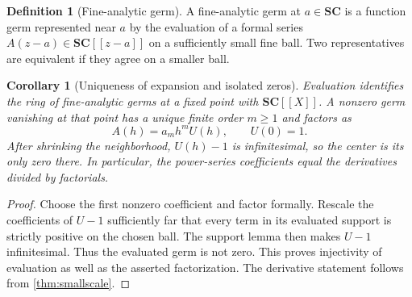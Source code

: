 \documentclass[11pt,letterpaper]{article}
\newtheorem{corollary}[theorem]{Corollary}
\theoremstyle{definition}
\newtheorem{definition}[theorem]{Definition}
\theoremstyle{remark}
\newcommand{\SC}{\mathbf{SC}}
\numberwithin{equation}{section}
\begin{document}
\begin{definition}[Fine-analytic germ]
A fine-analytic germ at $a\in\SC$ is a function germ represented near $a$ by the evaluation of a formal series $A(z-a)\in\SC[[z-a]]$ on a sufficiently small fine ball. Two representatives are equivalent if they agree on a smaller ball.
\end{definition}

\begin{corollary}[Uniqueness of expansion and isolated zeros]\label{cor:localzeros}
Evaluation identifies the ring of fine-analytic germs at a fixed point with $\SC[[X]]$. A nonzero germ vanishing at that point has a unique finite order $m\ge1$ and factors as
\[
 A(h)=a_mh^mU(h),\qquad U(0)=1.
\]
After shrinking the neighborhood, $U(h)-1$ is infinitesimal, so the center is its only zero there. In particular, the power-series coefficients equal the derivatives divided by factorials.
\end{corollary}
\begin{proof}
Choose the first nonzero coefficient and factor formally. Rescale the coefficients of $U-1$ sufficiently far that every term in its evaluated support is strictly positive on the chosen ball. The support lemma then makes $U-1$ infinitesimal. Thus the evaluated germ is not zero. This proves injectivity of evaluation as well as the asserted factorization. The derivative statement follows from \cref{thm:smallscale}.
\end{proof}
\end{document}
